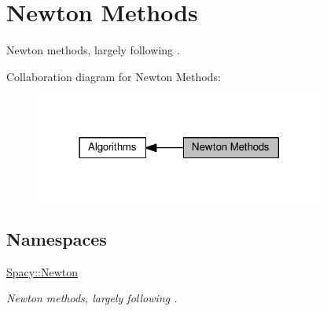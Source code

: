 \hypertarget{group__NewtonGroup}{}\section{Newton Methods}
\label{group__NewtonGroup}


Newton methods, largely following \cite{Deuflhard2004}.  


Collaboration diagram for Newton Methods\+:\nopagebreak
\begin{figure}[H]
\begin{center}
\leavevmode
\includegraphics[width=270pt]{group__NewtonGroup}
\end{center}
\end{figure}
\subsection*{Namespaces}
\begin{DoxyCompactItemize}
\item 
 \hyperlink{namespaceSpacy_1_1Newton}{Spacy\+::\+Newton}
\begin{DoxyCompactList}\small\item\em Newton methods, largely following \cite{Deuflhard2004}. \end{DoxyCompactList}\end{DoxyCompactItemize}
